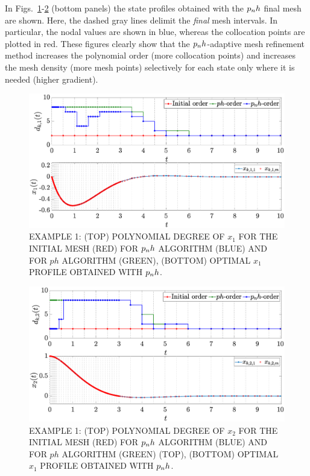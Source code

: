 In Figs.~\ref{fig:pnh1vanderpol}-\ref{fig:pnh2vanderpol} (bottom panels) the state profiles obtained with the $p_{n}h$ final mesh are shown. Here, the dashed gray lines delimit the \emph{final} mesh intervals. In particular, the nodal values are shown in blue, whereas the collocation points are plotted in red. These figures clearly show that the $p_{n}h$-adaptive mesh refinement method increases the polynomial order (more collocation points) and increases the mesh density (more mesh points) selectively for each state only where it is needed (higher gradient).
\begin{figure}[t]
	\centering
	\includegraphics[trim={1cm 0.1cm 2cm 0.5cm},clip,width=1\columnwidth]{Img/pnh1_vanderpol1}
	\caption{EXAMPLE 1:  (TOP) POLYNOMIAL DEGREE OF $x_{1}$ FOR THE INITIAL MESH (RED) FOR $p_{n}h$ ALGORITHM (BLUE) AND FOR $ph$ ALGORITHM (GREEN), (BOTTOM)
	OPTIMAL $x_1$ PROFILE OBTAINED WITH $p_{n}h$.}
	\label{fig:pnh1vanderpol}
\end{figure}
\begin{figure}[t]
	\centering
	\includegraphics[trim={1cm 0.1cm 2cm 0.5cm},clip,width=1\columnwidth]{Img/pnh2_vanderpol2}
	\caption{EXAMPLE 1: (TOP) POLYNOMIAL DEGREE OF $x_{2}$ FOR THE INITIAL MESH (RED) FOR $p_{n}h$ ALGORITHM (BLUE) AND FOR $ph$ ALGORITHM (GREEN) (TOP), (BOTTOM)
	OPTIMAL $x_1$ PROFILE OBTAINED WITH  $p_{n}h$.}
	\label{fig:pnh2vanderpol}
\end{figure}
